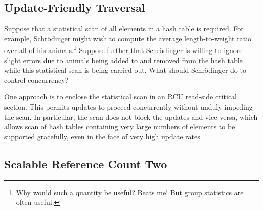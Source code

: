 
\subsection{Update-Friendly Traversal}
\label{sec:together:Update-Friendly Traversal}

Suppose that a statistical scan of all elements in a hash table is
required.
For example, Schr\"odinger might wish to compute the average
length-to-weight ratio over all of his animals.\footnote{
	Why would such a quantity be useful?
	Beats me!
	But group statistics are often useful.}
Suppose further that Schr\"odinger is willing to ignore slight
errors due to animals being added to and removed from the hash
table while this statistical scan is being carried out.
What should Schr\"odinger do to control concurrency?

One approach is to enclose the statistical scan in an RCU read-side
critical section.
This permits updates to proceed concurrently without unduly impeding
the scan.
In particular, the scan does not block the updates and vice versa,
which allows scan of hash tables containing very large numbers of
elements to be supported gracefully, even in the face of very high
update rates.

\QuickQuizEnd

\subsection{Scalable Reference Count Two}
\label{sec:together:Scalable Reference Count Two}

